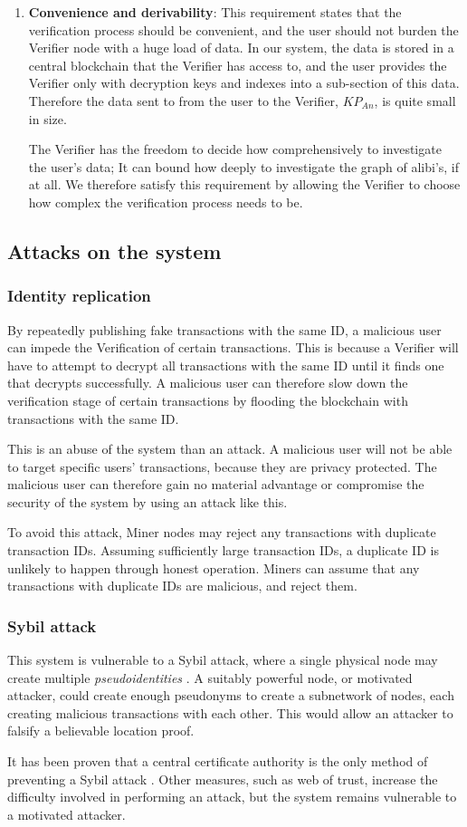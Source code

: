 \begin{enumerate}
\item[] \textbf{Convenience and derivability}: This requirement states that the verification process should be convenient, and the user should not burden the Verifier node with a huge load of data. In our system, the data is stored in a central blockchain that the Verifier has access to, and the user provides the Verifier only with decryption keys and indexes into a sub-section of this data. Therefore the data sent to from the user to the Verifier, $KP_{An}$, is quite small in size.

The Verifier has the freedom to decide how comprehensively to investigate the user's data; It can bound how deeply to investigate the graph of alibi's, if at all. We therefore satisfy this requirement by allowing the Verifier to choose how complex the verification process needs to be.
\end{enumerate}

\subsection{Attacks on the system}
\subsubsection{Identity replication}
By repeatedly publishing fake transactions with the same ID, a malicious user can impede the Verification of certain transactions. This is because a Verifier will have to attempt to decrypt all transactions with the same ID until it finds one that decrypts successfully. A malicious user can therefore slow down the verification stage of certain transactions by flooding the blockchain with transactions with the same ID.

This is an abuse of the system than an attack. A malicious user will not be able to target specific users' transactions, because they are privacy protected. The malicious user can therefore gain no material advantage or compromise the security of the system by using an attack like this.

To avoid this attack, Miner nodes may reject any transactions with duplicate transaction IDs. Assuming sufficiently large transaction IDs, a duplicate ID is unlikely to happen through honest operation. Miners can assume that any transactions with duplicate IDs are malicious, and reject them.

\subsubsection{Sybil attack}
This system is vulnerable to a Sybil attack, where a single physical node may create multiple \textit{pseudoidentities} \cite{sybil}. A suitably powerful node, or motivated attacker, could create enough pseudonyms to create a subnetwork of nodes, each creating malicious transactions with each other. This would allow an attacker to falsify a believable location proof.

It has been proven that a central certificate authority is the only method of preventing a Sybil attack \cite{sybil}. Other measures, such as web of trust, increase the difficulty involved in performing an attack, but the system remains vulnerable to a motivated attacker.